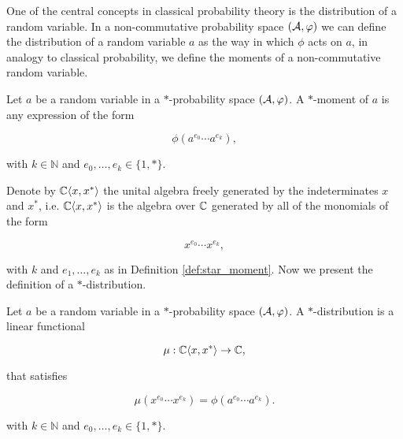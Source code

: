     One of the central concepts in classical probability theory is the distribution of a random variable. In a non-commutative probability space $(\mathcal A,\varphi)$ we can define the distribution of a random variable $a$ as the way in which $\phi$ acts on $a$, in analogy to classical probability, we define the moments of a non-commutative random variable.

    \begin{definition} \label{def:star_moment}
        Let $a$ be a random variable in a $*$-probability space $(\mathcal A,\varphi)$. A $*$-moment of $a$ is any expression of the form

        \begin{equation*}
            \phi(a^{e_0}\cdots a^{e_k}),
        \end{equation*}

        \noindent with $k \in \mathbb{N}$ and $e_0, \dots, e_k \in \{1,*\}$.
    \end{definition}

    Denote by $\mathbb C\langle x, x^*\rangle$ the unital algebra freely generated by the indeterminates $x$ and $x^*$, i.e. $\mathbb C\langle x,x^*\rangle$ is the algebra over $\mathbb C$ generated by all of the monomials of the form

    \begin{equation*}
        x^{e_0}\cdots x^{e_k},
    \end{equation*}

    \noindent with $k$ and $e_1, \dots, e_k$ as in Definition \ref{def:star_moment}. Now we present the definition of a $*$-distribution.

    \begin{definition}
        Let $a$ be a random variable in a $*$-probability space $(\mathcal A,\varphi)$. A $*$-distribution is a linear functional

        \begin{equation*}
            \mu : \mathbb C\langle x, x^*\rangle \to \mathbb C,
        \end{equation*}

        \noindent that satisfies

        \begin{equation*}
            \mu(x^{e_0}\cdots x^{e_k}) = \phi(a^{e_0}\cdots a^{e_k}).
        \end{equation*}

        \noindent with $k \in \mathbb{N}$ and $e_0, \dots, e_k \in \{1,*\}$.
    \end{definition}

